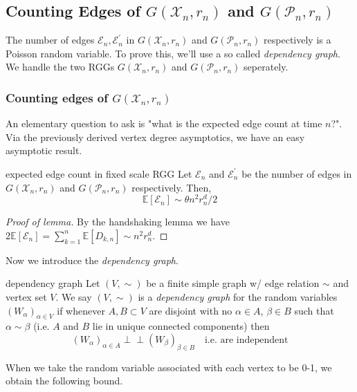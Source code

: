 \documentclass{article}
\newcommand{\indep}{\perp\!\!\!\!\perp}
\begin{document}
\subsection{Counting Edges of $G(\mathcal{X}_n, r_n)$ and $G(\mathcal{P}_n, r_n)$}

The number of edges $\mathcal{E}_n, \mathcal{E}_n^\prime$ in $G(\mathcal{X}_n, r_n)$ and $G(\mathcal{P}_n, r_n)$ respectively 
is a Poisson random variable. To prove this, we'll use a so called {\it dependency graph}. We handle the two 
RGGs $G(\mathcal{X}_n, r_n)$ and $G(\mathcal{P}_n, r_n)$ seperately. 

\subsubsection*{Counting edges of $G(\mathcal{X}_n, r_n)$}

An elementary question to ask is "what is the expected edge count at time $n$?". Via the previously derived 
vertex degree asymptotics, we have an easy asymptotic result.  

\begin{proposition}[]{expected edge count in fixed scale RGG}
    Let $\mathcal{E}_n$ and $\mathcal{E}^\prime_n$ be the number of edges in $G(\mathcal{X}_n, r_n)$ and 
    $G(\mathcal{P}_n, r_n)$ respectively. Then,
    \[\mathbb{E}[\mathcal{E}_n] \sim \theta n^2 r_n^d / 2\]
\end{proposition}

\begin{proof}[Proof of lemma]
    By the handshaking lemma we have $2\mathbb{E}[\mathcal{E}_n] = \sum_{k = 1}^n \mathbb{E}[D_{k, n}] \sim n^2 r_n^d$. 
\end{proof}

Now we introduce the {\it dependency graph}. 

\begin{definition}[]{dependency graph}
    Let $(V, \sim)$ be a finite simple graph w/ edge relation $\sim$ and vertex set $V$. We say $(V, \sim)$ is a 
    {\it dependency graph} for the random variables $(W_\alpha)_{\alpha \in V}$ if whenever $A, B \subset V$ are 
    disjoint with no $\alpha \in A$, $\beta \in B$ such that $\alpha \sim \beta$ (i.e. $A$ and $B$ lie in unique 
    connected components) then \[(W_\alpha)_{\alpha \in A} \indep (W_\beta)_{\beta \in B} \quad \text{i.e. are independent}\]
\end{definition}

When we take the random variable associated with each vertex to be 0-1, we obtain the following bound. 
\end{document}

